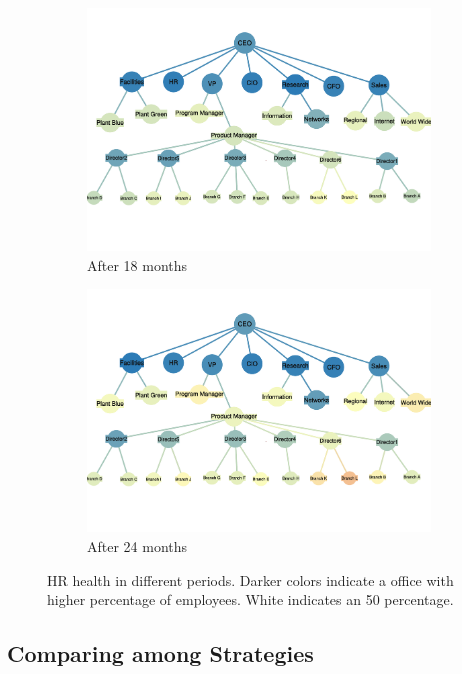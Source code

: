 \documentclass[tcn = 37075, sheet = false, abstract = false]{mcmthesis}
\begin{document}
\begin{figure}[t!]
\begin{subfigure}[h]{0.45\textwidth}
                \includegraphics[width=\textwidth]{figures/18.pdf}
                \caption{After 18 months}
        \end{subfigure}%
        \begin{subfigure}[h]{0.45\textwidth}
                \includegraphics[width=\textwidth]{figures/24.pdf}
                \caption{After 24 months}
        \end{subfigure}
        \caption{HR health in different periods. Darker colors indicate a office with higher percentage of employees. White indicates an 50 percentage.}
        \label{fig:hr-health}
\end{figure}


\subsection{Comparing among Strategies}
\end{document}
